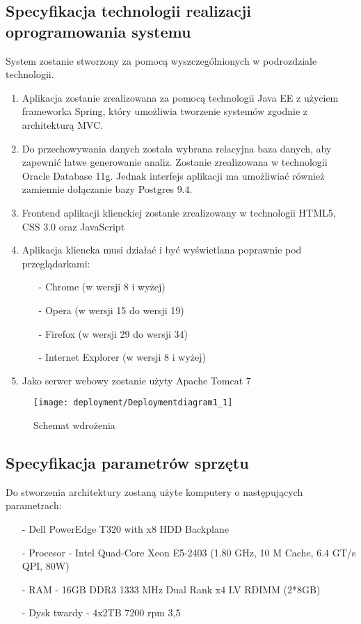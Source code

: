 \subsection{Specyfikacja technologii realizacji oprogramowania systemu}
\begin{adjustwidth}{2em}{0pt}
System zostanie stworzony za pomocą wyszczególnionych w podrozdziale technologii.
\begin{enumerate}
	\item Aplikacja zostanie zrealizowana za pomocą technologii Java EE z użyciem frameworka Spring, który umożliwia tworzenie systemów zgodnie z architekturą MVC.
	\item Do przechowywania danych została wybrana relacyjna baza danych, aby zapewnić łatwe generowanie analiz. Zostanie zrealizowana w technologii Oracle Database 11g. Jednak interfejs aplikacji ma umożliwiać również zamiennie dołączanie bazy Postgres 9.4.
	\item Frontend aplikacji klienckiej zostanie zrealizowany w technologii HTML5, CSS 3.0 oraz JavaScript
	\item Aplikacja kliencka musi działać i być wyświetlana poprawnie pod przeglądarkami:
	\begin{itemize}
	 \item[-] Chrome (w wersji 8 i wyżej)
	 \item[-] Opera (w wersji 15 do wersji 19)
	 \item[-] Firefox (w wersji 29 do wersji 34)
	 \item[-] Internet Explorer (w wersji 8 i wyżej)
	 \end{itemize}
	\item Jako serwer webowy zostanie użyty Apache Tomcat 7
\end{enumerate}

\begin{figure}[H]
    \centering
	\texttt{[image: deployment/Deploymentdiagram1\_1]}
    \caption{Schemat wdrożenia}
    \label{fig:Deploymentdiagram1}
\end{figure}

\end{adjustwidth}

\subsection{Specyfikacja parametrów sprzętu}
\begin{adjustwidth}{2em}{0pt}
Do stworzenia architektury zostaną użyte komputery o następujących parametrach:
\begin{itemize}
\item[-] Dell PowerEdge T320 with x8 HDD Backplane 
\item[-] Procesor - Intel Quad-Core Xeon E5-2403 (1.80 GHz, 10 M Cache, 6.4 GT/s QPI, 80W)
\item[-] RAM - 16GB DDR3 1333 MHz Dual Rank x4 LV RDIMM (2*8GB)
\item[-] Dysk twardy - 4x2TB 7200 rpm 3,5
\end{itemize}
\end{adjustwidth}